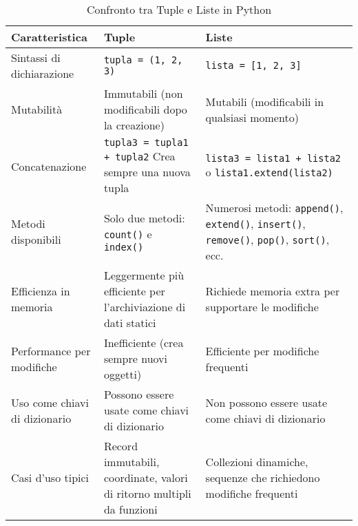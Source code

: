 \begin{table}[htbp]
    \centering
    \begin{tabular}{
        >{\raggedright\arraybackslash}p{3.5cm}  %
        >{\centering\arraybackslash}p{5cm}      %
        >{\centering\arraybackslash}p{5cm}      %
    }
    \toprule
    \rowcolor{blue!10} 
    \textbf{Caratteristica} & \textbf{Tuple} & \textbf{Liste} \\
    \midrule
    
    Sintassi di dichiarazione & \texttt{tupla = (1, 2, 3)} & \texttt{lista = [1, 2, 3]} \\
    
    \rowcolor{gray!6}
    Mutabilità & Immutabili (non modificabili dopo la creazione) & Mutabili (modificabili in qualsiasi momento) \\
    
    Concatenazione & \texttt{tupla3 = tupla1 + tupla2} \newline Crea sempre una nuova tupla & \texttt{lista3 = lista1 + lista2} o \newline \texttt{lista1.extend(lista2)} \\
    
    \rowcolor{gray!6}
    Metodi disponibili & Solo due metodi: \texttt{count()} e \texttt{index()} & Numerosi metodi: \texttt{append()}, \texttt{extend()}, \texttt{insert()}, \texttt{remove()}, \texttt{pop()}, \texttt{sort()}, ecc. \\
    
    Efficienza in memoria & Leggermente più efficiente per l'archiviazione di dati statici & Richiede memoria extra per supportare le modifiche \\
    
    \rowcolor{gray!6}
    Performance per modifiche & Inefficiente (crea sempre nuovi oggetti) & Efficiente per modifiche frequenti \\
    
    Uso come chiavi di dizionario & Possono essere usate come chiavi di dizionario & Non possono essere usate come chiavi di dizionario \\
    
    \rowcolor{gray!6}
    Casi d'uso tipici & Record immutabili, coordinate, valori di ritorno multipli da funzioni & Collezioni dinamiche, sequenze che richiedono modifiche frequenti \\
    
    \bottomrule
    \end{tabular}
    \caption{Confronto tra Tuple e Liste in Python}
    \label{tab:tuple_liste_comparison}
\end{table}

